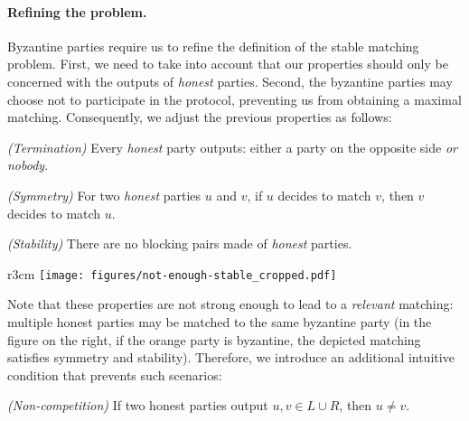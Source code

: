 \paragraph{Refining the problem.} 
Byzantine parties require us to refine the definition of the stable matching problem. First, we need to take into account that our properties should only be concerned with the outputs of \emph{honest} parties. Second, the byzantine parties may choose not to participate in the protocol, preventing us from obtaining a maximal matching. Consequently, we adjust the previous properties as follows:

\vspace{0.1cm}
\noindent \emph{(Termination)} Every \emph{honest} party outputs: either a party on the opposite side \emph{or nobody}.

\noindent \emph{(Symmetry)} For two \emph{honest} parties $u$ and $v$, if $u$ decides to match $v$, then $v$ decides to match $u$.

\noindent \emph{(Stability)} There are no blocking pairs made of \emph{honest} parties.

\vspace{0.1cm}



\begin{wrapfigure}{r}{3cm}
\centering
\texttt{[image: figures/not-enough-stable\_cropped.pdf]}
\vspace{-1.5cm}
\end{wrapfigure} 



Note that these properties are not strong enough to lead to a \emph{relevant} matching: multiple honest parties may be matched to the same byzantine party (in the figure on the right, if the orange party is byzantine, the depicted matching satisfies 
symmetry and stability).
Therefore, we introduce an additional intuitive condition that prevents such scenarios:


\vspace{0.1cm}
\noindent \emph{(Non-competition)} If two honest parties output $u, v \in L \cup R$, then $u \neq v$.
\vspace{0.15cm}



